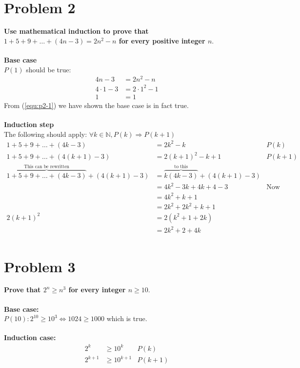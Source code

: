 \documentclass[english,11pt,a4paper]{article}
\begin{document}
\section*{Problem 2}
\textbf{Use mathematical induction to prove that $1+5+9+\ldots+(4n-3)=2n^2-n$ for every positive integer $n$}.
\\
\\
\textbf{Base case} 
\\
$P(1)$ should be true:
\begin{align}
4n-3 &= 2n^2-n \\
4\cdot 1-3 &= 2\cdot 1^2-1 \\
1 &= 1 \label{equ:p2-1}
\end{align}
From (\ref{equ:p2-1}) we have shown the base case is in fact true.
\\
\\
\textbf{Induction step}
\\
The following should apply: $\forall k \in \mathbb{N}, P(k) \Rightarrow P(k+1)$
\begin{align}
1+5+9+\ldots+(4k-3) &= 2k^2-k & P(k)\\
1+5+9+\ldots+(4(k+1)-3) &= 2(k+1)^2-k+1 & P(k+1)\\
\overbrace{1+5+9+\ldots+(4k-3)}^{\text{This can be rewritten}}+(4(k+1)-3) &= \overbrace{k(4k-3)}^\text{to this}+(4(k+1)-3)\\
	&= 4k^2-3k+4k+4-3 & \text{Now what?} \\
	&= 4k^2+k+1 \label{equ:p2-2}\\
	&= 2k^2+2k^2+k+1\\
 2(k+1)^2 &= 2(k^2+1+2k)\\
	&= 2k^2+2+4k\\
\end{align}



\section*{Problem 3}
\textbf{Prove that $2^n \geq n^3$ for every integer $n \geq 10$}.
\\
\\
\textbf{Base case:}
\\
$P(10): 2^{10}\geq 10^3 \Leftrightarrow 1024 \geq 1000$ which is true.
\\
\\
\textbf{Induction case:}
\\
\begin{align}
2^k &\geq 10^k & P(k)\\
2^{k+1} &\geq 10^{k+1} & P(k+1)
\end{align}
\end{document}

